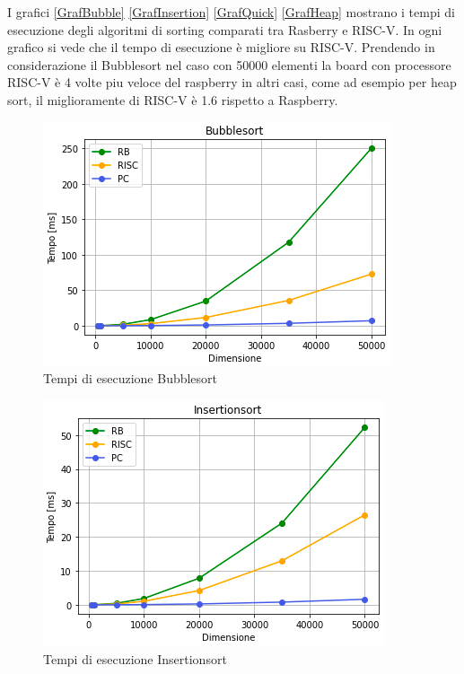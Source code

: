\documentclass[12pt,a4paper]{report}
\begin{document}
I grafici \ref{GrafBubble} \ref{GrafInsertion} \ref{GrafQuick} \ref{GrafHeap} mostrano i tempi di esecuzione degli algoritmi di sorting comparati tra Rasberry e RISC-V. In ogni grafico si vede che il tempo di esecuzione è migliore su RISC-V. Prendendo in considerazione il Bubblesort nel caso con 50000 elementi la board con processore RISC-V è 4 volte piu veloce del raspberry in altri casi, come ad esempio per heap sort, il miglioramente di RISC-V è 1.6 rispetto a Raspberry. 


\begin{figure}[ht]
\centering
         \includegraphics[scale=0.8]{Img/GraficiSorting/Bubblesort_All.PNG}
         \caption{Tempi di esecuzione Bubblesort}
\end{figure}

\begin{figure}[ht]
\centering
         \includegraphics[scale=0.8]{Img/GraficiSorting/Insertionsort_All.PNG}
         \caption{Tempi di esecuzione Insertionsort}
\end{figure}
	
\end{document}
